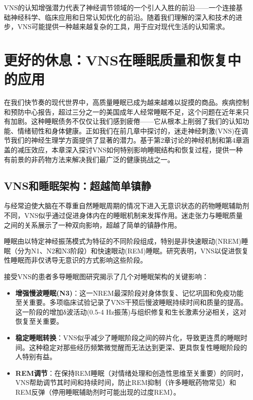 \documentclass[
  Letterpaper,
]{scrbook}
\begin{document}
VNS的认知增强潜力代表了神经调节领域的一个引人入胜的前沿------一个连接基础神经科学、临床应用和日常认知优化的前沿。随着我们理解的深入和技术的进步，VNS可能提供一种越来越复杂的工具，用于应对现代生活的认知需求。


\chapter{更好的休息：VNS在睡眠质量和恢复中的应用}\label{ux66f4ux597dux7684ux4f11ux606fvnsux5728ux7761ux7720ux8d28ux91cfux548cux6062ux590dux4e2dux7684ux5e94ux7528}

在我们快节奏的现代世界中，高质量睡眠已成为越来越难以捉摸的商品。疾病控制和预防中心报告，超过三分之一的美国成年人经常睡眠不足，这个问题在近年来只有加剧。这种睡眠债务不仅仅让我们感到疲倦------它从根本上削弱了我们的认知功能、情绪韧性和身体健康。正如我们在前几章中探讨的，迷走神经刺激(VNS)在调节我们的神经生理学方面提供了显著的潜力。基于第2章讨论的神经机制和第4章涵盖的减压效应，本章深入探讨VNS如何特别影响睡眠结构和恢复过程，提供一种有前景的非药物方法来解决我们最广泛的健康挑战之一。

\section{VNS和睡眠架构：超越简单镇静}\label{vnsux548cux7761ux7720ux67b6ux6784ux8d85ux8d8aux7b80ux5355ux9547ux9759}

与经常迫使大脑在不尊重自然睡眠周期的情况下进入无意识状态的药物睡眠辅助剂不同，VNS似乎通过促进身体内在的睡眠机制来发挥作用。迷走张力与睡眠质量之间的关系展示了一种双向影响，超越了简单的镇静作用。

睡眠由以特定神经振荡模式为特征的不同阶段组成，特别是非快速眼动(NREM)睡眠（分为N1、N2和N3阶段）和快速眼动(REM)睡眠。研究表明，VNS以促进恢复性睡眠而非仅诱导无意识的方式影响这些阶段。

接受VNS的患者多导睡眠图研究揭示了几个对睡眠架构的关键影响：

\begin{itemize}
\item
  \textbf{增强慢波睡眠(N3)}：这一NREM最深阶段对身体恢复、记忆巩固和免疫功能至关重要。多项临床试验记录了VNS干预后慢波睡眠持续时间和质量的提高。这一阶段的增加δ波活动(0.5-4
  Hz振荡)与组织修复和生长激素分泌相关，这对恢复至关重要。
\item
  \textbf{稳定睡眠转换}：VNS似乎减少了睡眠阶段之间的碎片化，导致更连贯的睡眠时间。这种稳定对那些经历频繁微觉醒而无法达到更深、更具恢复性睡眠阶段的人特别有益。
\item
  \textbf{REM调节}：在保持REM睡眠（对情绪处理和创造性思维至关重要）的同时，VNS帮助调节其时间和持续时间，防止REM抑制（许多睡眠药物常见）和REM反弹（停用睡眠辅助剂时可能出现的过度REM）。
\end{itemize}
\end{document}
